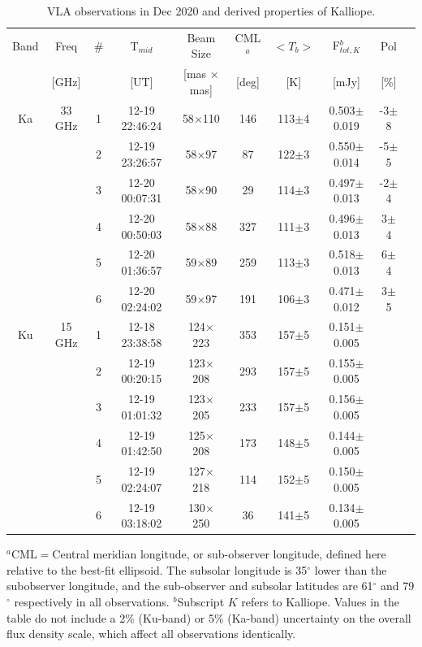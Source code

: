 \documentclass[]{aastex631}
\begin{document}
\begin{table}[h!]
\scriptsize
\begin{center}
\caption{VLA observations in Dec 2020 and derived properties of  Kalliope. \label{tbl:VLAobs}}
\begin{tabular}{cccccccccc}
\hline
Band & Freq & \# & T$_{mid}$ & Beam Size & CML$^a$ & $<T_b>$ & F$_{tot,K}^b$ & Pol \\
 & [GHz] & & [UT] & [mas $\times$ mas] & [deg] & [K] & [mJy] & [\%] \\
\hline
Ka & 33 GHz & 1 & 12-19 22:46:24 & 58$\times$110 & 146 & 113$\pm$4 & 0.503$\pm$0.019 & -3$\pm$8 \\
 & & 2 & 12-19 23:26:57 & 58$\times$97 & 87 & 122$\pm$3 & 0.550$\pm$0.014 & -5$\pm$5 \\
 & & 3 & 12-20 00:07:31 & 58$\times$90 & 29 & 114$\pm$3 & 0.497$\pm$0.013 & -2$\pm$4 \\
 & & 4 & 12-20 00:50:03 & 58$\times$88 & 327 & 111$\pm$3 & 0.496$\pm$0.013 & 3$\pm$4 \\
 & & 5 & 12-20 01:36:57 & 59$\times$89 & 259 & 113$\pm$3 & 0.518$\pm$0.013 & 6$\pm$4 \\
 & & 6 & 12-20 02:24:02 & 59$\times$97 & 191 & 106$\pm$3 & 0.471$\pm$0.012 & 3$\pm$5 \\
 \hline
Ku & 15 GHz & 1 & 12-18 23:38:58 & 124$\times$223 & 353 & 157$\pm$5 & 0.151$\pm$0.005 & \\
 & & 2 & 12-19 00:20:15 & 123$\times$208 & 293 & 157$\pm$5 & 0.155$\pm$0.005 & \\
 & & 3 & 12-19 01:01:32 & 123$\times$205 & 233 & 157$\pm$5 & 0.156$\pm$0.005 & \\
 & & 4 & 12-19 01:42:50 & 125$\times$208 & 173 & 148$\pm$5 & 0.144$\pm$0.005 & \\
 & & 5 & 12-19 02:24:07 & 127$\times$218 & 114 & 152$\pm$5 & 0.150$\pm$0.005 & \\
 & & 6 & 12-19 03:18:02 & 130$\times$250 & 36 & 141$\pm$5 & 0.134$\pm$0.005 & \\
 \end{tabular}
\end{center}
$^a$CML$=$Central meridian longitude, or sub-observer longitude, defined here relative to the best-fit ellipsoid. The subsolar longitude is 35$^{\circ}$ lower than the subobserver longitude, and the sub-observer and subsolar latitudes are 61$^{\circ}$ and 79$^{\circ}$ respectively in all observations.
$^b$Subscript $K$ refers to Kalliope. Values in the table do not include a 2\% (Ku-band) or 5\% (Ka-band) uncertainty on the overall flux density scale, which affect all observations identically.\\
\end{table}
\end{document}
